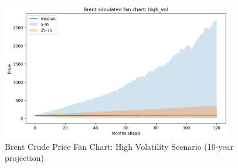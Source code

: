 \documentclass[11pt]{article}
\begin{document}
\begin{figure}[htbp]
\centering
\includegraphics[width=0.9\textwidth]{fan_brent_high_vol.png}
\caption{Brent Crude Price Fan Chart: High Volatility Scenario (10-year projection)}
\label{fig:fan_brent}
\end{figure}
\end{document}
